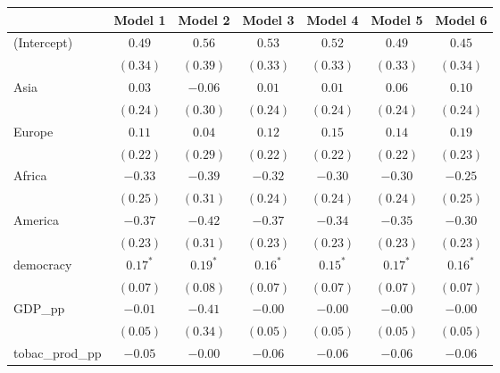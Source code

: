 
\begin{table}[!h]
\begin{center}
\begin{tabular}{l c c c c c c }
\toprule
 & Model 1 & Model 2 & Model 3 & Model 4 & Model 5 & Model 6 \\
\midrule
(Intercept)             & $0.49$       & $0.56$      & $0.53$       & $0.52$       & $0.49$       & $0.45$       \\
                        & $(0.34)$     & $(0.39)$    & $(0.33)$     & $(0.33)$     & $(0.33)$     & $(0.34)$     \\
Asia                    & $0.03$       & $-0.06$     & $0.01$       & $0.01$       & $0.06$       & $0.10$       \\
                        & $(0.24)$     & $(0.30)$    & $(0.24)$     & $(0.24)$     & $(0.24)$     & $(0.24)$     \\
Europe                  & $0.11$       & $0.04$      & $0.12$       & $0.15$       & $0.14$       & $0.19$       \\
                        & $(0.22)$     & $(0.29)$    & $(0.22)$     & $(0.22)$     & $(0.22)$     & $(0.23)$     \\
Africa                  & $-0.33$      & $-0.39$     & $-0.32$      & $-0.30$      & $-0.30$      & $-0.25$      \\
                        & $(0.25)$     & $(0.31)$    & $(0.24)$     & $(0.24)$     & $(0.24)$     & $(0.25)$     \\
America                 & $-0.37$      & $-0.42$     & $-0.37$      & $-0.34$      & $-0.35$      & $-0.30$      \\
                        & $(0.23)$     & $(0.31)$    & $(0.23)$     & $(0.23)$     & $(0.23)$     & $(0.23)$     \\
democracy               & $0.17^{*}$   & $0.19^{*}$  & $0.16^{*}$   & $0.15^{*}$   & $0.17^{*}$   & $0.16^{*}$   \\
                        & $(0.07)$     & $(0.08)$    & $(0.07)$     & $(0.07)$     & $(0.07)$     & $(0.07)$     \\
GDP\_pp                 & $-0.01$      & $-0.41$     & $-0.00$      & $-0.00$      & $-0.00$      & $-0.00$      \\
                        & $(0.05)$     & $(0.34)$    & $(0.05)$     & $(0.05)$     & $(0.05)$     & $(0.05)$     \\
tobac\_prod\_pp         & $-0.05$      & $-0.00$     & $-0.06$      & $-0.06$      & $-0.06$      & $-0.06$      \\

\end{tabular}
\end{center}
\end{table}
